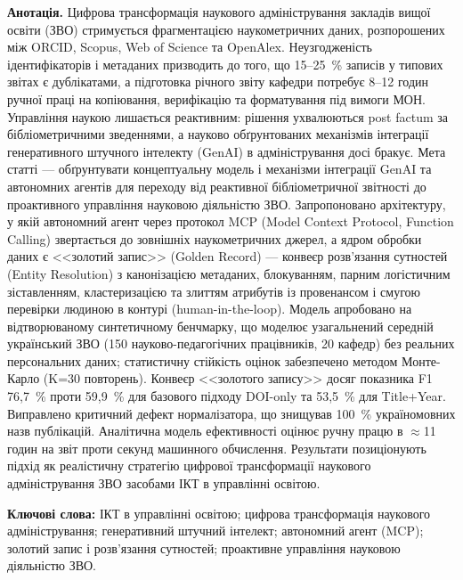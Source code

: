 \textbf{Анотація.} Цифрова трансформація наукового адміністрування закладів вищої освіти (ЗВО) стримується фрагментацією наукометричних даних, розпорошених між ORCID, Scopus, Web of Science та OpenAlex. Неузгодженість ідентифікаторів і метаданих призводить до того, що 15--25~\% записів у типових звітах є дублікатами, а підготовка річного звіту кафедри потребує 8--12 годин ручної праці на копіювання, верифікацію та форматування під вимоги МОН. Управління наукою лишається реактивним: рішення ухвалюються post factum за бібліометричними зведеннями, а науково обґрунтованих механізмів інтеграції генеративного штучного інтелекту (GenAI) в адміністрування досі бракує. Мета статті --- обґрунтувати концептуальну модель і механізми інтеграції GenAI та автономних агентів для переходу від реактивної бібліометричної звітності до проактивного управління науковою діяльністю ЗВО. Запропоновано архітектуру, у якій автономний агент через протокол MCP (Model Context Protocol, Function Calling) звертається до зовнішніх наукометричних джерел, а ядром обробки даних є <<золотий запис>> (Golden Record) --- конвеєр розв'язання сутностей (Entity Resolution) з канонізацією метаданих, блокуванням, парним логістичним зіставленням, кластеризацією та злиттям атрибутів із провенансом і смугою перевірки людиною в контурі (human-in-the-loop). Модель апробовано на відтворюваному синтетичному бенчмарку, що моделює узагальнений середній український ЗВО (150 науково-педагогічних працівників, 20 кафедр) без реальних персональних даних; статистичну стійкість оцінок забезпечено методом Монте-Карло (K=30 повторень). Конвеєр <<золотого запису>> досяг показника F1 76,7~\% проти 59,9~\% для базового підходу DOI-only та 53,5~\% для Title+Year. Виправлено критичний дефект нормалізатора, що знищував 100~\% україномовних назв публікацій. Аналітична модель ефективності оцінює ручну працю в $\approx$11 годин на звіт проти секунд машинного обчислення. Результати позиціонують підхід як реалістичну стратегію цифрової трансформації наукового адміністрування ЗВО засобами ІКТ в управлінні освітою.

\textbf{Ключові слова:} ІКТ в управлінні освітою; цифрова трансформація наукового адміністрування; генеративний штучний інтелект; автономний агент (MCP); золотий запис і розв'язання сутностей; проактивне управління науковою діяльністю ЗВО.

\bigskip

